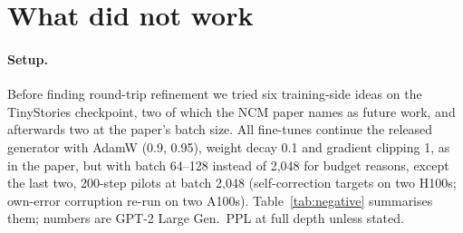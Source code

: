 \documentclass[10pt]{article}
\begin{document}
\section{What did not work}
\label{sec:negative}

\paragraph{Setup.} Before finding round-trip refinement we tried six training-side ideas on the TinyStories checkpoint, two of which the NCM paper names as future work, and afterwards two at the paper's batch size. All fine-tunes continue the released generator with AdamW (0.9, 0.95), weight decay 0.1 and gradient clipping 1, as in the paper, but with batch 64--128 instead of 2{,}048 for budget reasons, except the last two, 200-step pilots at batch 2{,}048 (self-correction targets on two H100s; own-error corruption re-run on two A100s). Table~\ref{tab:negative} summarises them; numbers are GPT-2 Large Gen.\ PPL at full depth unless stated.
\end{document}
